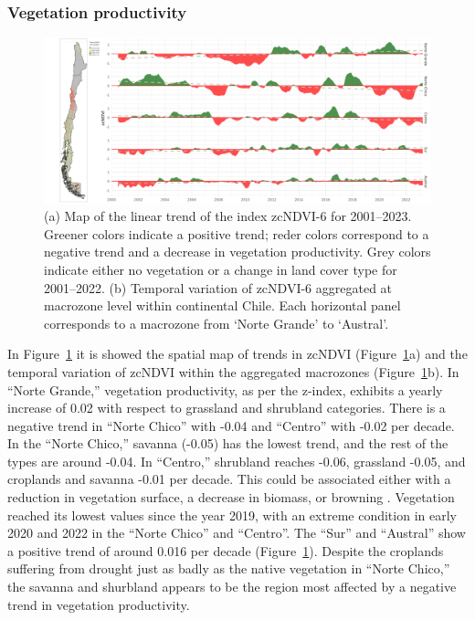 \documentclass[
  authoryear,
  preprint,
  3p,
  onecolumn]{elsarticle}
\begin{document}
\hypertarget{vegetation-productivity}{%
\subsubsection{Vegetation productivity}\label{vegetation-productivity}}

\begin{figure}[!ht]

{\centering \includegraphics{../output/figs/temporal_variation_zcNDVI6_macrozonas_con_mapa.png}

}

\caption{\label{fig-zcNDVI_var}(a) Map of the linear trend of the index
zcNDVI-6 for 2001--2023. Greener colors indicate a positive trend; reder
colors correspond to a negative trend and a decrease in vegetation
productivity. Grey colors indicate either no vegetation or a change in
land cover type for 2001--2022. (b) Temporal variation of zcNDVI-6
aggregated at macrozone level within continental Chile. Each horizontal
panel corresponds to a macrozone from `Norte Grande' to `Austral'.}

\end{figure}

In Figure~\ref{fig-zcNDVI_var} it is showed the spatial map of trends in
zcNDVI (Figure~\ref{fig-zcNDVI_var}a) and the temporal variation of
zcNDVI within the aggregated macrozones (Figure~\ref{fig-zcNDVI_var}b).
In ``Norte Grande,'' vegetation productivity, as per the z-index,
exhibits a yearly increase of 0.02 with respect to grassland and
shrubland categories. There is a negative trend in ``Norte Chico'' with
-0.04 and ``Centro'' with -0.02 per decade. In the ``Norte Chico,''
savanna (-0.05) has the lowest trend, and the rest of the types are
around -0.04. In ``Centro,'' shrubland reaches -0.06, grassland -0.05,
and croplands and savanna -0.01 per decade. This could be associated
either with a reduction in vegetation surface, a decrease in biomass, or
browning \citep{Miranda2023}. Vegetation reached its lowest values since
the year 2019, with an extreme condition in early 2020 and 2022 in the
``Norte Chico'' and ``Centro''. The ``Sur'' and ``Austral'' show a
positive trend of around 0.016 per decade (Figure~\ref{fig-zcNDVI_var}).
Despite the croplands suffering from drought just as badly as the native
vegetation in ``Norte Chico,'' the savanna and shurbland appears to be
the region most affected by a negative trend in vegetation productivity.
\end{document}
